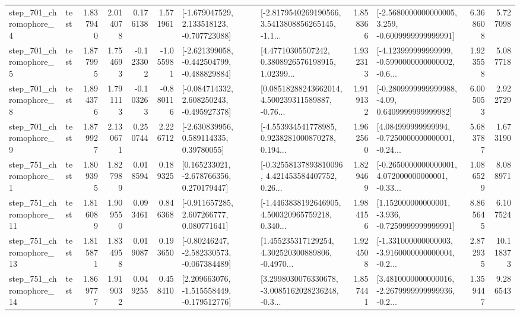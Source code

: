 \begin{tabular}{llrrrrllrlrr}
   step\_701\_chromophore\_4 &      test &      1.837940 &    2.014078 &      0.176138 &  1.571961 &   [-1.679047529, 2.133518123, -0.707723088] &  [-2.8179540269190566, 3.5413808856265145, -1.1... &       1.858366 &  [-2.5680000000000005, 3.259, -0.6009999999999991] &            6.368608 &          5.727098 \\
   step\_701\_chromophore\_5 &      test &      1.877995 &    1.754693 &     -0.123302 & -1.055981 &  [-2.621399058, -0.442504799, -0.488829884] &  [4.47710305507242, 0.3808926576198915, 1.02399... &       1.932313 &  [-4.123999999999999, -0.5990000000000002, -0.6... &            1.923558 &          5.087718 \\
   step\_701\_chromophore\_8 &      test &      1.894376 &    1.791113 &     -0.103263 & -0.880116 &   [-0.084714332, 2.608250243, -0.495927378] &  [0.08518288243662014, 4.500239311589887, -0.76... &       1.919132 &   [-0.2809999999999988, -4.09, 0.6409999999999982] &            6.005053 &          2.922729 \\
   step\_701\_chromophore\_9 &      test &      1.879927 &    2.130671 &      0.250744 &  2.226712 &     [-2.630839956, 0.589114335, 0.39780055] &  [-4.553934541778985, 0.9238281000870278, 0.194... &       1.962560 &  [4.084999999999994, -0.7250000000000001, -0.24... &            5.683787 &          1.673190 \\
   step\_751\_chromophore\_1 &      test &      1.809395 &    1.827989 &      0.018594 &  0.189325 &    [0.165233021, -2.678766356, 0.270179447] &  [-0.32558137893810096, 4.421453584407752, 0.26... &       1.829469 &  [-0.2650000000000001, 4.072000000000001, -0.33... &            1.086529 &          8.088971 \\
  step\_751\_chromophore\_11 &      test &      1.816089 &    1.909550 &      0.093461 &  0.846368 &    [-0.911657285, 2.607266777, 0.080771641] &  [-1.4463838192646905, 4.500320965759218, 0.340... &       1.984156 &   [1.152000000000001, -3.936, -0.7259999999999991] &            8.865645 &          6.107524 \\
  step\_751\_chromophore\_13 &      test &      1.815871 &    1.834958 &      0.019087 &  0.193650 &   [-0.80246247, -2.582330573, -0.067384489] &  [1.455235317129254, 4.302520300889806, -0.4970... &       1.924508 &  [-1.331000000000003, -3.9160000000000004, -0.2... &            2.872935 &         10.118373 \\
  step\_751\_chromophore\_14 &      test &      1.869777 &    1.919032 &      0.049255 &  0.458410 &   [2.209663076, -1.515558449, -0.179512776] &  [3.2998030076330678, -3.0085162028236248, -0.3... &       1.857441 &  [3.4810000000000016, -2.2679999999999936, -0.2... &            1.359447 &          9.286543 \\

\end{tabular}

